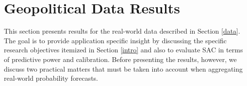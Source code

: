 \documentclass[aoas, preprint]{imsart}
\numberwithin{equation}{section}
\theoremstyle{plain}
\begin{document}
%
%
%
%
%
%




\section{Geopolitical Data Results}
\label{realData}
\noindent
This section presents results for the real-world data described in Section \ref{data}. The goal is to provide application specific insight by discussing the specific research objectives itemized in Section \ref{intro} and also to evaluate SAC in terms of predictive power and calibration. Before presenting the results, however, we discuss two practical matters that must be taken into account when aggregating real-world  probability forecasts.
\end{document}
